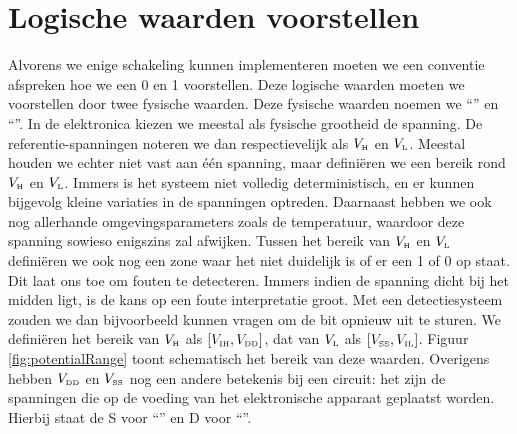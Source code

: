 \section{Logische waarden voorstellen}
\label{s:logischeWaarden}
Alvorens we enige schakeling kunnen implementeren moeten we een conventie afspreken hoe we een 0 en 1 voorstellen. Deze logische waarden moeten we voorstellen door twee fysische waarden. Deze fysische waarden noemen we ``'' en ``''. In de elektronica kiezen we meestal als fysische grootheid de spanning. De referentie-spanningen noteren we dan respectievelijk als $V_{\mbox{\tiny H}}$ en $V_{\mbox{\tiny L}}$. Meestal houden we echter niet vast aan \'e\'en spanning, maar defini\"eren we een bereik rond $V_{\mbox{\tiny H}}$ en $V_{\mbox{\tiny L}}$. Immers is het systeem niet volledig deterministisch, en er kunnen bijgevolg kleine variaties in de spanningen optreden. Daarnaast hebben we ook nog allerhande omgevingsparameters zoals de temperatuur, waardoor deze spanning sowieso enigszins zal afwijken. Tussen het bereik van $V_{\mbox{\tiny H}}$ en $V_{\mbox{\tiny L}}$ defini\"eren we ook nog een zone waar het niet duidelijk is of er een 1 of 0 op staat. Dit laat ons toe om fouten te detecteren. Immers indien de spanning dicht bij het midden ligt, is de kans op een foute interpretatie groot. Met een detectiesysteem zouden we dan bijvoorbeeld kunnen vragen om de bit opnieuw uit te sturen. We defini\"eren het bereik van $V_{\mbox{\tiny H}}$ als $\left[V_{\mbox{\tiny IH}},V_{\mbox{\tiny DD}}\right]$, dat van $V_{\mbox{\tiny L}}$ als $\left[V_{\mbox{\tiny SS}},V_{\mbox{\tiny IL}}\right]$. Figuur \ref{fig:potentialRange} toont schematisch het bereik van deze waarden. Overigens hebben $V_{\mbox{\tiny DD}}$ en $V_{\mbox{\tiny SS}}$ nog een andere betekenis bij een circuit: het zijn de spanningen die op de voeding van het elektronische apparaat geplaatst worden. Hierbij staat de S voor ``'' en D voor ``''.
